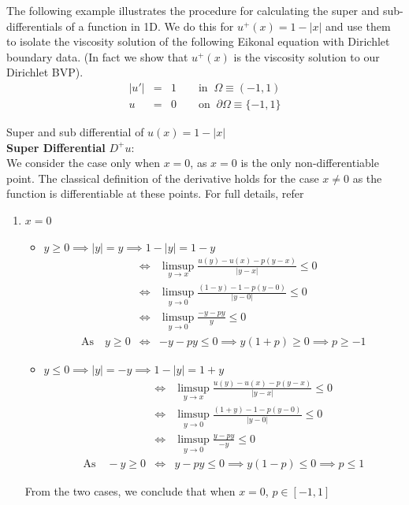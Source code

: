 \noindent
The following example illustrates the procedure for calculating the
super and sub-differentials of a function in 1D. We do this for
$u^+(x) = 1 - \lvert x \rvert$ and use them to isolate the viscosity
solution of the following Eikonal equation with Dirichlet boundary
data. (In fact we show that $u^+(x)$ is the viscosity solution to our
Dirichlet BVP).
\begin{eqnarray}
  |u'| &=& 1 \qquad \text{in} \;\; \Omega \equiv (-1,1)\\
  u &=& 0 \qquad \text {on} \;\; \partial \Omega \equiv \{-1,1\}
\end{eqnarray}
\begin{example}
  Super and sub differential of $u(x) = 1-\lvert x \rvert$\\

  \noindent
  \textbf{Super Differential} $D^+u$:\\

  \noindent
  We consider the case only when $x=0$, as $x=0$ is the only
  non-differentiable point. The classical definition of the derivative
  holds for the case $x\ne 0$ as the function is differentiable at
  these points. For full details, refer \cite{yong}
  \begin{enumerate}
  \item $x = 0$
    \begin{itemize}
    \item
      $y \ge 0 \implies \lvert y \rvert = y \implies 1 - \lvert y
      \rvert = 1 - y$
      \begin{eqnarray}
        &\iff&\limsup \limits_{y \to x} \frac{u(y)-u(x) - p(y-x)}{\lvert y -x \rvert} \le 0\\
        &\iff& \limsup \limits_{y \to 0} \frac{(1-y)-1 - p(y-0)}{\lvert y -0 \rvert} \le 0\\
        &\iff& \limsup \limits_{y \to 0} \frac{-y - py}{ y } \le 0\\
        \text{As} \quad y \ge 0 &\iff& -y-py \le 0 \implies y(1+p) \ge 0 \nonumber
                                       \implies p \ge -1
      \end{eqnarray}

    \item
      $y \le 0 \implies \lvert y \rvert = -y \implies 1 - \lvert y
      \rvert = 1 + y$
      \begin{eqnarray}
        &\iff&\limsup \limits_{y \to x} \frac{u(y)-u(x) - p(y-x)}{\lvert y -x \rvert} \le 0\\
        &\iff& \limsup \limits_{y \to 0} \frac{(1+y)-1 - p(y-0)}{\lvert y -0 \rvert} \le 0\\
        &\iff& \limsup \limits_{y \to 0} \frac{y - py}{ -y } \le 0\\
        \text{As} \quad -y \ge 0 &\iff& y-py \le 0 \implies y(1-p) \le 0 \nonumber
                                        \implies p \le 1
      \end{eqnarray}
    \end{itemize}
    From the two cases, we conclude that when $x=0$, $p\in[-1,1]$


\end{enumerate}
\end{example}
